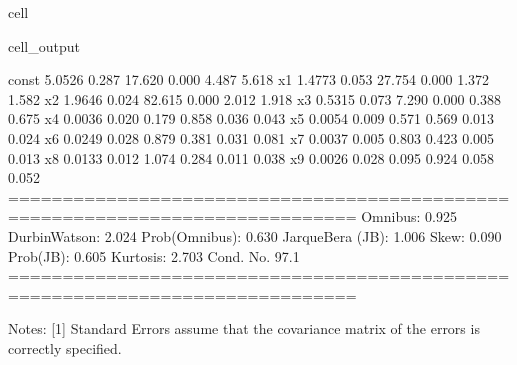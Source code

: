 \documentclass[letterpaper,10pt,english]{jupyterBook}
\begin{document}
\begin{sphinxuseclass}{cell}
\begin{sphinxVerbatimOutput}
\begin{sphinxuseclass}{cell_output}
\begin{sphinxVerbatim}[commandchars=\\\{\}]
const          5.0526      0.287     17.620      0.000       4.487       5.618
x1             1.4773      0.053     27.754      0.000       1.372       1.582
x2            \PYGZhy{}1.9646      0.024    \PYGZhy{}82.615      0.000      \PYGZhy{}2.012      \PYGZhy{}1.918
x3             0.5315      0.073      7.290      0.000       0.388       0.675
x4             0.0036      0.020      0.179      0.858      \PYGZhy{}0.036       0.043
x5             0.0054      0.009      0.571      0.569      \PYGZhy{}0.013       0.024
x6             0.0249      0.028      0.879      0.381      \PYGZhy{}0.031       0.081
x7             0.0037      0.005      0.803      0.423      \PYGZhy{}0.005       0.013
x8             0.0133      0.012      1.074      0.284      \PYGZhy{}0.011       0.038
x9            \PYGZhy{}0.0026      0.028     \PYGZhy{}0.095      0.924      \PYGZhy{}0.058       0.052
==============================================================================
Omnibus:                        0.925   Durbin\PYGZhy{}Watson:                   2.024
Prob(Omnibus):                  0.630   Jarque\PYGZhy{}Bera (JB):                1.006
Skew:                          \PYGZhy{}0.090   Prob(JB):                        0.605
Kurtosis:                       2.703   Cond. No.                         97.1
==============================================================================

Notes:
[1] Standard Errors assume that the covariance matrix of the errors is correctly specified.
\end{sphinxVerbatim}

\end{sphinxuseclass}\end{sphinxVerbatimOutput}

\end{sphinxuseclass}
\end{document}
